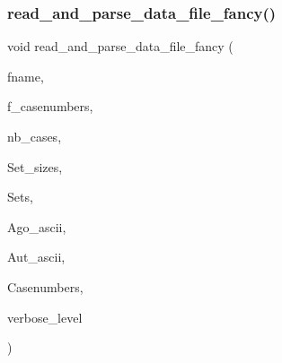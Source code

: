 \subsubsection{\texorpdfstring{read\+\_\+and\+\_\+parse\+\_\+data\+\_\+file\+\_\+fancy()}{read\_and\_parse\_data\_file\_fancy()}}
{\footnotesize\ttfamily void read\+\_\+and\+\_\+parse\+\_\+data\+\_\+file\+\_\+fancy (\begin{DoxyParamCaption}\item[{const \mbox{\hyperlink{galois_8h_ab6cc7b4aeb6ea31aba2b3fbfc83ff5e6}{B\+Y\+TE}} $\ast$}]{fname,  }\item[{\mbox{\hyperlink{galois_8h_a09fddde158a3a20bd2dcadb609de11dc}{I\+NT}}}]{f\+\_\+casenumbers,  }\item[{\mbox{\hyperlink{galois_8h_a09fddde158a3a20bd2dcadb609de11dc}{I\+NT}} \&}]{nb\+\_\+cases,  }\item[{\mbox{\hyperlink{galois_8h_a09fddde158a3a20bd2dcadb609de11dc}{I\+NT}} $\ast$\&}]{Set\+\_\+sizes,  }\item[{\mbox{\hyperlink{galois_8h_a09fddde158a3a20bd2dcadb609de11dc}{I\+NT}} $\ast$$\ast$\&}]{Sets,  }\item[{\mbox{\hyperlink{galois_8h_ab6cc7b4aeb6ea31aba2b3fbfc83ff5e6}{B\+Y\+TE}} $\ast$$\ast$\&}]{Ago\+\_\+ascii,  }\item[{\mbox{\hyperlink{galois_8h_ab6cc7b4aeb6ea31aba2b3fbfc83ff5e6}{B\+Y\+TE}} $\ast$$\ast$\&}]{Aut\+\_\+ascii,  }\item[{\mbox{\hyperlink{galois_8h_a09fddde158a3a20bd2dcadb609de11dc}{I\+NT}} $\ast$\&}]{Casenumbers,  }\item[{\mbox{\hyperlink{galois_8h_a09fddde158a3a20bd2dcadb609de11dc}{I\+NT}}}]{verbose\+\_\+level }\end{DoxyParamCaption})}

\mbox{\label{util_8_c_abcf0cb14cb6873ca687baa4711c96f29}} 
